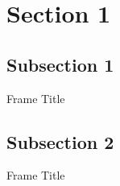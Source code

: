 \section{Section 1}

\subsection{Subsection 1}

\begin{frame}{Frame Title}

\end{frame}

\subsection{Subsection 2}

\begin{frame}{Frame Title}
    \begin{itemize}

    \end{itemize}
\end{frame}